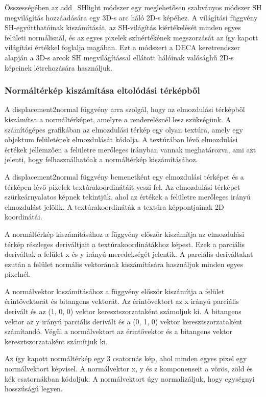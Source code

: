 \documentclass[12pt,a4]{article}
\begin{document}
Összességében az add\_SHlight módszer egy meglehetősen szabványos módszer SH megvilágítás hozzáadására egy 3D-s arc háló 2D-s képéhez. A világítási függvény SH-együtthatóinak kiszámítását, 
az SH-világítás kiértékelését minden egyes felületi normálisnál, és az egyes pixelek színértékének megszorzását az így kapott világítási értékkel foglalja magában. 
Ezt a módszert a DECA keretrendszer alapján a 3D-s arcok SH megvilágítással ellátott hálóinak valósághű 2D-s képeinek létrehozására használjuk.

\subsubsection{Normáltérkép kiszámítása eltolódási térképből}

A displacement2normal függvény arra szolgál, hogy az elmozdulási térképből kiszámítsa a normáltérképet, amelyre a renderelésnél lesz szükségünk. 
A számítógépes grafikában az elmozdulási térkép egy olyan textúra, amely egy objektum felületének elmozdulását kódolja.
A textúrában lévő elmozdulási értékek jellemzően a felületre merőleges irányban vannak meghatározva, ami azt jelenti, hogy felhasználhatóak a normáltérkép kiszámításához.

A displacement2normal függvény bemenetként egy elmozdulási térképet és a térképen lévő pixelek textúrakoordinátáit veszi fel. 
Az elmozdulási térképet szürkeárnyalatos képnek tekintjük, ahol az értékek a felületre merőleges irányú elmozdulást jelölik.
A textúrakoordináták a textúra képpontjainak 2D koordinátái.

A normáltérkép kiszámításához a függvény először kiszámítja az elmozdulási térkép részleges deriváltjait a textúrakoordinátákhoz képest.
Ezek a parciális deriváltak a felület x és y irányú meredekségét jelentik. A parciális deriváltakat ezután a felület normális vektorának kiszámítására használjuk minden egyes pixelnél.

A normálvektor kiszámításához a függvény először kiszámítja a felület érintővektorát és bitangens vektorát.
Az érintővektort az x irányú parciális derivált és az (1, 0, 0) vektor keresztszorzataként számoljuk ki. 
A bitangens vektor az y irányú parciális derivált és a (0, 1, 0) vektor keresztszorzataként számítandó. 
Végül a normálvektort az érintővektor és a bitangens vektor keresztszorzataként számítjuk ki.

Az így kapott normáltérkép egy 3 csatornás kép, ahol minden egyes pixel egy normálvektort képvisel. 
A normálvektor x, y és z komponenseit a vörös, zöld és kék csatornákban kódoljuk. 
A normálvektort úgy normalizáljuk, hogy egységnyi hosszúságú legyen.
\end{document}
